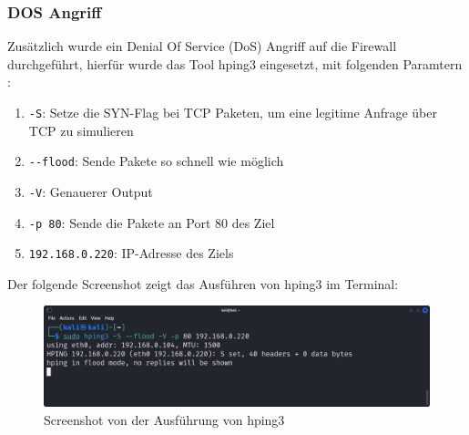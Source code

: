 \documentclass[
    a4paper,
    pagesize,
	pdftex,
    12pt,
]{scrartcl}
\begin{document}
\subsubsection{DOS Angriff}
Zusätzlich wurde ein Denial Of Service (DoS) Angriff auf die Firewall durchgeführt, hierfür wurde das Tool hping3 eingesetzt, mit folgenden Paramtern \cite{hping-kalitools}:
\begin{enumerate}
	\item \lstinline[breaklines]|-S|: Setze die SYN-Flag bei TCP Paketen, um eine legitime Anfrage über TCP zu simulieren
	\item \lstinline[breaklines]|--flood|: Sende Pakete so schnell wie möglich
	\item \lstinline[breaklines]|-V|: Genauerer Output
	\item \lstinline[breaklines]|-p 80|: Sende die Pakete an Port 80 des Ziel
	\item \lstinline[breaklines]|192.168.0.220|: IP-Adresse des Ziels
\end{enumerate}

Der folgende Screenshot zeigt das Ausführen von hping3 im Terminal:
\begin{figure}[H]
	\centering
	\includegraphics[width=12cm]{dos-hping3.png}
	\caption{Screenshot von der Ausführung von hping3}
	\label{fig:dos-hpgin3}
\end{figure}
\end{document}
